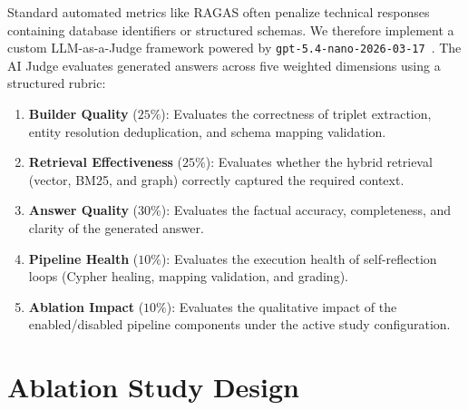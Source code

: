 Standard automated metrics like RAGAS often penalize technical responses containing database identifiers or structured schemas. We therefore implement a custom LLM-as-a-Judge framework powered by \texttt{gpt-5.4-nano-2026-03-17}~\cite{openai2024gpt54nano}. The AI Judge evaluates generated answers across five weighted dimensions using a structured rubric:
\begin{enumerate}
    \item \textbf{Builder Quality} ($25\%$): Evaluates the correctness of triplet extraction, entity resolution deduplication, and schema mapping validation.
    \item \textbf{Retrieval Effectiveness} ($25\%$): Evaluates whether the hybrid retrieval (vector, BM25, and graph) correctly captured the required context.
    \item \textbf{Answer Quality} ($30\%$): Evaluates the factual accuracy, completeness, and clarity of the generated answer.
    \item \textbf{Pipeline Health} ($10\%$): Evaluates the execution health of self-reflection loops (Cypher healing, mapping validation, and grading).
    \item \textbf{Ablation Impact} ($10\%$): Evaluates the qualitative impact of the enabled/disabled pipeline components under the active study configuration.
\end{enumerate}

\section{Ablation Study Design}
\label{sec:eval:ablation_design}

